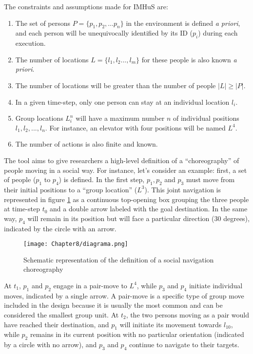 The constraints and assumptions made for IMHuS are:
\begin{enumerate}
    \item The set of persons $P=\{p_1, p_2, ... p_n\}$ in the environment is defined {\em a priori}, and each person will be unequivocally identified by its ID ($p_i$) during each execution.
    \item The number of locations $L=\{l_1, l_2...,l_m\}$ for these people is also known {\em a priori}.
    \item The number of locations will be greater than the number of people $|L| \geq |P|$.
    \item In a given time-step, only one person can stay at an individual location $l_i$.
    \item Group locations $L^n_i$ will have a maximum number $n$ of individual positions $l_1, l_2, ..., l_n$. For instance, an elevator with four positions will be named $L^4$.
    \item The number of actions is also finite and known.
\end{enumerate}

The tool aims to give researchers a high-level definition of a ``choreography'' of people moving in a social way. For instance, let's consider an example: first, a set of people ($p_1$ to $p_4$) is defined. In the first step, $p_1, p_2$ and $p_3$ must move from their initial positions to a ``group location'' ($L^3$). This joint navigation is represented in figure \ref{fig:diagram} as a continuous top-opening box grouping the three people at time-step $t_0$ and a double arrow labeled with the goal destination. In the same way, $p_4$ will remain in its position but will face a particular direction (30 degrees), indicated by the circle with an arrow. 

 \begin{figure}[h!]%
    \centering
    \texttt{[image: Chapter8/diagrama.png]}
    \caption{Schematic representation of the definition of a social navigation choreography}
    \label{fig:diagram}
\end{figure}

At $t_1$, $p_1$ and $p_2$ engage in a pair-move to $L^4$, while $p_3$ and $p_4$ initiate individual moves, indicated by a single arrow. A pair-move is a specific type of group move included in the design because it is usually the most common and can be considered the smallest group unit. At $t_2$, the two persons moving as a pair would have reached their destination, and $p_1$ will initiate its movement towards $l_{10}$, while $p_2$ remains in its current position with no particular orientation (indicated by a circle with no arrow), and $p_3$ and $p_4$ continue to navigate to their targets.

